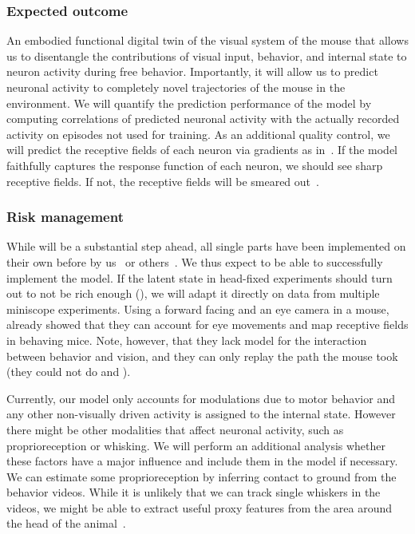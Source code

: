 \documentclass[B2,COG]{ercgrant}
\begin{document}
\subsubsection{Expected outcome} 

An embodied functional digital twin of the visual system of the mouse that allows us to disentangle the contributions of visual input, behavior, and internal state to neuron activity during free behavior. 
Importantly, it will allow us to predict neuronal activity to completely novel trajectories of the mouse in the environment.
We will quantify the prediction performance of the model by computing correlations of predicted neuronal activity with the actually recorded activity on episodes not used for training. 
As an additional quality control, we will predict the receptive fields of each neuron via gradients as in~\textcite{Sinz2018-sk}. 
If the model faithfully captures the response function of each neuron, we should see sharp receptive fields.
If not, the receptive fields will be smeared out~\parencite{Parker2022-ac}.

\subsubsection{Risk management} 
While  will be a substantial step ahead, all single parts have been implemented on their own before by us~\parencite{Sinz2018-sk, Bashiri2021-or} or others~\parencite{Parker2022-ac,Holmgren2021-jv}. 
We thus expect to be able to successfully implement the model. 
If the latent state in head-fixed experiments should turn out to not be rich enough (), we will adapt it directly on data from multiple miniscope experiments. 
Using a forward facing and an eye camera in a mouse, \textcite{Parker2022-ac} already showed that they can account for eye movements and map receptive fields in behaving mice. Note, however, that they lack model for the interaction between behavior and vision, and they can only replay the path the mouse took (they could not do  and ).

Currently, our model only accounts for modulations due to motor behavior and any other non-visually driven activity is assigned to the internal state. 
However there might be other modalities that affect neuronal activity, such as proprioreception or whisking. 
We will perform an additional analysis whether these factors have a major influence and include them in the model if necessary. 
We can estimate some proprioreception by inferring contact to ground from the behavior videos.
While it is unlikely that we can track single whiskers in the videos, we might be able to extract useful proxy features from the area around the head of the animal~\parencite{Syeda2022-bk}.
\end{document}
